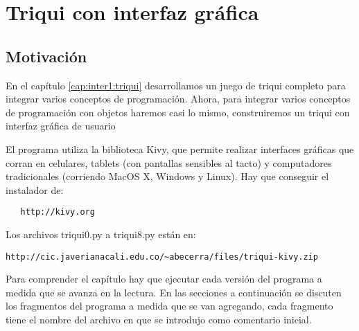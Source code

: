 


\chapter{Triqui con interfaz gráfica}


\section{Motivación}
En el capítulo \ref{cap:inter1:triqui} desarrollamos un juego de triqui completo
para integrar varios conceptos de programación. Ahora, para integrar varios
conceptos de programación con objetos haremos casi lo mismo, construiremos un triqui
con interfaz gráfica de usuario

El programa utiliza la biblioteca Kivy, que permite realizar interfaces
gráficas que corran en celulares, tablets (con pantallas sensibles al tacto) 
y computadores tradicionales (corriendo MacOS X, Windows y Linux). Hay que 
conseguir el instalador de: 

\begin{verbatim}
   http://kivy.org
\end{verbatim}

Los archivos triqui0.py a triqui8.py están en:

\begin{verbatim}
http://cic.javerianacali.edu.co/~abecerra/files/triqui-kivy.zip
\end{verbatim}

Para comprender el capítulo hay que ejecutar cada versión del programa a 
medida que se avanza en la lectura. En las secciones a continuación se discuten 
los fragmentos del programa a medida que se van agregando, cada fragmento tiene 
el nombre del archivo en que se introdujo como comentario inicial.

